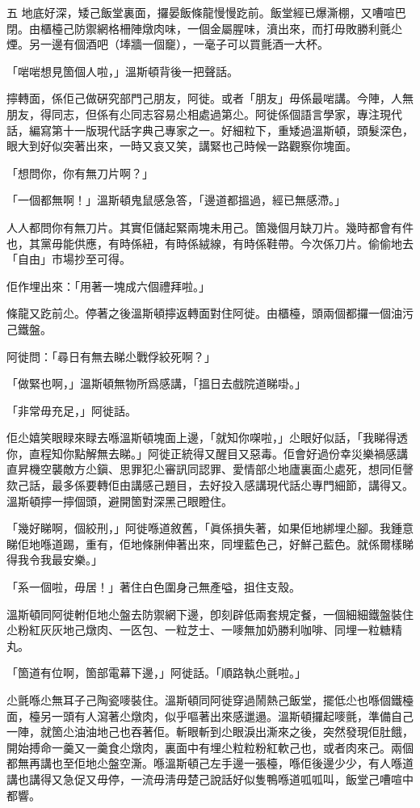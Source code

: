 五
地底好深，矮己飯堂裏面，攞晏飯條龍慢慢趷前。飯堂經已爆澌棚，又嘈喧巴閉。由櫃檯己防禦網格柵陣燉肉味，一個金屬腥味，濆出來，而打毋敗勝利氈尐煙。另一邊有個酒吧（埲牆一個竉），一毫子可以買氈酒一大杯。

「啱啱想見箇個人啦，」溫斯頓背後一把聲話。

擰轉面，係佢己做硏究部門己朋友，阿徙。或者「朋友」毋係最啱講。今陣，人無朋友，得同志，但係有尐同志容易尐相處過第尐。阿徙係個語言學家，專注現代話，編寫第十一版現代話字典己專家之一。好細粒下，重矮過溫斯頓，頭髮深色，眼大到好似突著出來，一時又哀又笑，講緊也己時候一路觀察你塊面。

「想問你，你有無刀片啊？」

「一個都無啊！」溫斯頓鬼鼠感急答，「邊道都搵過，經已無感滯。」

人人都問你有無刀片。其實佢儲起緊兩塊未用己。箇幾個月缺刀片。幾時都會有件也，其黨毋能供應，有時係紐，有時係絨線，有時係鞋帶。今次係刀片。偷偷地去「自由」市場抄至可得。

佢作埋出來：「用著一塊成六個禮拜啦。」

條龍又趷前尐。停著之後溫斯頓擰返轉面對住阿徙。由櫃檯，頭兩個都攞一個油污己鐵盤。

阿徙問：「尋日有無去睇尐戰俘絞死啊？」

「做緊也啊，」溫斯頓無物所爲感講，「搵日去戲院道睇啩。」

「非常毋充足，」阿徙話。

佢尐嬉笑眼睩來睩去喺溫斯頓塊面上邊，「就知你㗎啦，」尐眼好似話，「我睇得透你，直程知你點解無去睇。」阿徙正統得又醒目又惡毒。佢會好過份幸災樂禍感講直昇機空襲敵方尐鎭、思罪犯尐審訊同認罪、愛情部尐地廬裏面尐處死，想同佢謦欬己話，最多係要轉佢由講感己題目，去好投入感講現代話尐專門細節，講得又。溫斯頓擰一擰個頭，避開箇對深黑己眼瞪住。

「幾好睇啊，個絞刑，」阿徙喺道敘舊，「眞係損失著，如果佢地綁埋尐腳。我鍾意睇佢地喺道踢，重有，佢地條脷伸著出來，同埋藍色己，好鮮己藍色。就係爾樣睇得我令我最安樂。」

「系一個啦，毋居！」著住白色圍身己無產嗌，抯住支殼。

溫斯頓同阿徙軵佢地尐盤去防禦網下邊，卽刻辟低兩套規定餐，一個細細鐵盤裝住尐粉紅灰灰地己燉肉、一匛包、一粒芝士、一嘜無加奶勝利咖啡、同埋一粒糖精丸。

「箇道有位啊，箇部電幕下邊，」阿徙話。「順路執尐氈啦。」

尐氈喺尐無耳子己陶瓷嘜裝住。溫斯頓同阿徙穿過鬧熱己飯堂，擺低尐也喺個鐵檯面，檯另一頭有人瀉著尐燉肉，似乎嘔著出來感邋遢。溫斯頓攞起嘜氈，準備自己一陣，就箇尐油油地己也吞著佢。斬眼斬到尐眼淚出澌來之後，突然發現佢肚餓，開始搏命一羹又一羹食尐燉肉，裏面中有埋尐粒粒粉紅軟己也，或者肉來己。兩個都無再講也至佢地尐盤空澌。喺溫斯頓己左手邊一張檯，喺佢後邊少少，有人喺道講也講得又急促又毋停，一流毋淸毋楚己說話好似隻鴨喺道呱呱叫，飯堂己嘈喧中都響。

